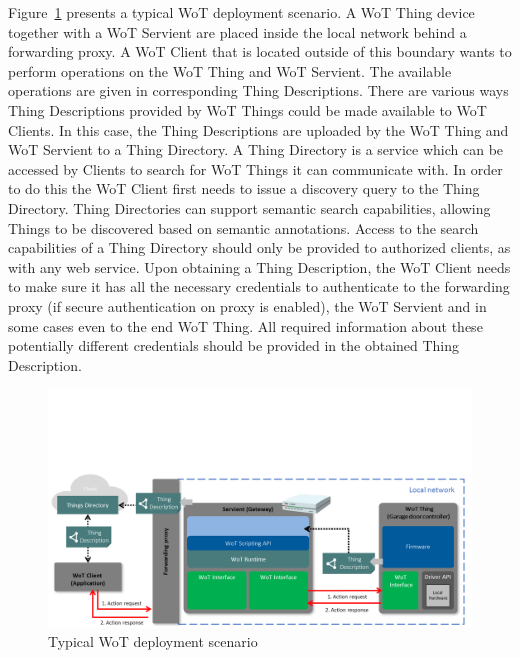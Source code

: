 
Figure~\ref{fig-wot-scenario} presents a typical WoT deployment scenario. 
A WoT Thing device together with a WoT Servient are placed inside 
the local network behind a forwarding proxy. 
A WoT Client that is located outside of this boundary wants to 
perform operations on the WoT Thing and WoT Servient.
The available operations are given in corresponding Thing Descriptions.
There are various ways Thing Descriptions provided by WoT Things
could be made available to WoT Clients.
In this case, the Thing Descriptions are 
uploaded by the WoT Thing and WoT Servient to a Thing Directory.
A Thing Directory is a service which can be accessed by Clients
to search for WoT Things it can communicate with.
In order to do this the WoT Client first needs to issue a 
discovery query to the Thing Directory.
Thing Directories can support semantic search capabilities, allowing
Things to be discovered based on semantic annotations. 
Access to the search capabilities of a Thing Directory should
only be provided to authorized clients, as with any web service.
Upon obtaining a Thing Description, 
the WoT Client needs to make sure it has all the necessary credentials
to authenticate to the forwarding proxy 
(if secure authentication on proxy is enabled), 
the WoT Servient and in some cases even to the end WoT Thing.
All required information about these potentially different 
credentials should be provided in the obtained Thing Description.  

\begin{figure}[!t]
\centering
\includegraphics[width=6in]{figures/wot-scenario.png}
\caption{Typical WoT deployment scenario}
\label{fig-wot-scenario}
\end{figure}

